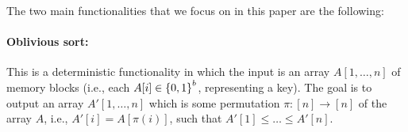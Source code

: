 %
%

The two main functionalities that we focus on in this paper are the following:

\paragraph{Oblivious sort:}
This is a deterministic functionality in which the input is an array $A[1,\ldots,n]$ of memory blocks (i.e., each $A[i] \in {\{0,1\}}^{b}$, representing a key). The goal is to output an array $A'[1,\ldots,n]$ which is some permutation $\pi:[n] \rightarrow [n]$ of the array $A$, i.e., $A'[i] = A[\pi(i)]$, such that $A'[1]\leq \ldots \leq A'[n]$. %

